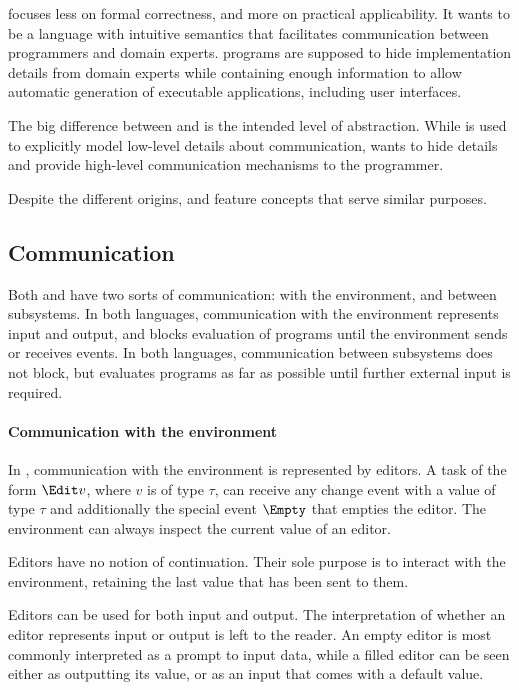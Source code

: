 \TOP focuses less on formal correctness, and more on practical applicability.
It wants to be a language with intuitive semantics that facilitates communication between programmers and domain experts.
\TOP programs are supposed to hide implementation details from domain experts while containing enough information to allow automatic generation of executable applications, including user interfaces.

The big difference between \CSP and \TOP is the intended level of abstraction.
While \CSP is used to explicitly model low-level details about communication, \TOP wants to hide details and provide high-level communication mechanisms to the programmer.

Despite the different origins, \TOP and \CSP feature concepts that serve similar purposes.



\subsection{Communication}

Both \TOP and \CSP have two sorts of communication: with the environment, and between subsystems.
In both languages, communication with the environment represents input and output, and blocks evaluation of programs until the environment sends or receives events.
In both languages, communication between subsystems does not block, but evaluates programs as far as possible until further external input is required.

\paragraph{Communication with the environment}
In \TOP, communication with the environment is represented by editors.
A task of the form $\Edit v$, where $v$ is of type $\tau$, can receive any change event with a value of type $\tau$ and additionally the special event $\Empty$ that empties the editor.
The environment can always inspect the current value of an editor.

Editors have no notion of continuation.
Their sole purpose is to interact with the environment, retaining the last value that has been sent to them.

Editors can be used for both input and output.
The interpretation of whether an editor represents input or output is left to the reader.
An empty editor is most commonly interpreted as a prompt to input data, while a filled editor can be seen either as outputting its value, or as an input that comes with a default value.

